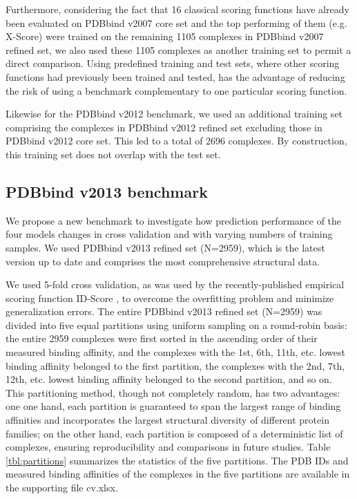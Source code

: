 \documentclass[journal=jacsat,manuscript=article]{achemso}
\begin{document}
Furthermore, considering the fact that 16 classical scoring functions have already been evaluated \cite{1313} on PDBbind v2007 core set and the top performing of them (e.g. X-Score) were trained on the remaining 1105 complexes in PDBbind v2007 refined set, we also used these 1105 complexes as another training set to permit a direct comparison. Using predefined training and test sets, where other scoring functions had previously been trained and tested, has the advantage of reducing the risk of using a benchmark complementary to one particular scoring function.

Likewise for the PDBbind v2012 benchmark, we used an additional training set comprising the complexes in PDBbind v2012 refined set excluding those in PDBbind v2012 core set. This led to a total of 2696 complexes. By construction, this training set does not overlap with the test set. %

\subsection{PDBbind v2013 benchmark}

We propose a new benchmark to investigate how prediction performance of the four models changes in cross validation and with varying numbers of training samples. We used PDBbind v2013 refined set (N=2959), which is the latest version up to date and comprises the most comprehensive structural data.

We used 5-fold cross validation, as was used by the recently-published empirical scoring function ID-Score \cite{1305}, to overcome the overfitting problem and minimize generalization errors. The entire PDBbind v2013 refined set (N=2959) was divided into five equal partitions using uniform sampling on a round-robin basis: the entire 2959 complexes were first sorted in the ascending order of their measured binding affinity, and the complexes with the 1st, 6th, 11th, etc. lowest binding affinity belonged to the first partition, the complexes with the 2nd, 7th, 12th, etc. lowest binding affinity belonged to the second partition, and so on. This partitioning method, though not completely random, has two advantages: one one hand, each partition is guaranteed to span the largest range of binding affinities and incorporates the largest structural diversity of different protein families; on the other hand, each partition is composed of a deterministic list of complexes, ensuring reproducibility and comparisons in future studies. Table \ref{tbl:partitions} summarizes the statistics of the five partitions. The PDB IDs and measured binding affinities of the complexes in the five partitions are available in the supporting file cv.xlsx.
\end{document}
